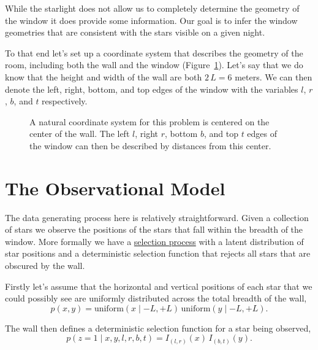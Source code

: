 \documentclass[
  letterpaper,
  DIV=11,
  numbers=noendperiod]{scrartcl}
\begin{document}
While the starlight does not allow us to completely determine the
geometry of the window it does provide some information. Our goal is to
infer the window geometries that are consistent with the stars visible
on a given night.

To that end let's set up a coordinate system that describes the geometry
of the room, including both the wall and the window
(Figure~\ref{fig-coordinate-system}). Let's say that we do know that the
height and width of the wall are both \(2 \, L = 6\) meters. We can then
denote the left, right, bottom, and top edges of the window with the
variables \(l\), \(r\), \(b\), and \(t\) respectively.

\begin{figure}


\caption{\label{fig-coordinate-system}A natural coordinate system for
this problem is centered on the center of the wall. The left \(l\),
right \(r\), bottom \(b\), and top \(t\) edges of the window can then be
described by distances from this center.}

\end{figure}%

\section{The Observational Model}\label{the-observational-model}

The data generating process here is relatively straightforward. Given a
collection of stars we observe the positions of the stars that fall
within the breadth of the window. More formally we have a
\href{https://betanalpha.github.io/assets/chapters_html/modeling_selection.html}{selection
process} with a latent distribution of star positions and a
deterministic selection function that rejects all stars that are
obscured by the wall.

Firstly let's assume that the horizontal and vertical positions of each
star that we could possibly see are uniformly distributed across the
total breadth of the wall, \[
p(x, y) = \text{uniform}(x \mid -L, +L) \, \text{uniform}(y \mid -L, +L).
\]

The wall then defines a deterministic selection function for a star
being observed, \[
p(z = 1 \mid x, y, l, r, b, t) = I_{(l, r)}(x) \, I_{(b, t)}(y).
\]
\end{document}
